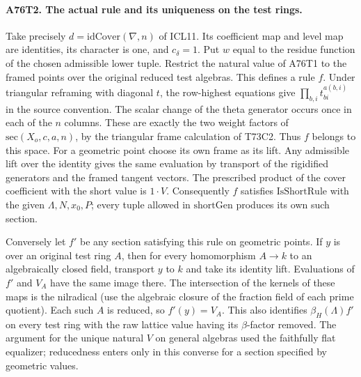 \paragraph{A76T2. The actual rule and its uniqueness on the test rings.}
Take precisely $d=\mathrm{idCover}(\nabla,n)$ of ICL11.
Its coefficient map and level map are identities, its character
is one, and $c_\delta=1$. Put $w$ equal to the residue function
of the chosen admissible lower tuple. Restrict the natural value of
A76T1 to the framed points over the original reduced test algebras.
This defines a rule $f$. Under triangular reframing with diagonal
$t$, the row-highest equations give $\prod_{b,i}t_{b i}^{a(b,i)}$
in the source convention. The scalar change of the theta generator
occurs once in each of the $n$ columns. These are exactly the two
weight factors of $\mathrm{sec}(X_o,c,a,n)$, by the triangular
frame calculation of T73C2. Thus $f$ belongs to this space.
For a geometric point choose its own frame as its lift. Any
admissible lift over the identity gives the same evaluation by
transport of the rigidified generators and the framed tangent
vectors. The prescribed product of the cover coefficient with the
short value is $1\cdot V$. Consequently $f$ satisfies
$\mathrm{IsShortRule}$ with the given $\Lambda,N,x_0,P$; every
tuple allowed in $\mathrm{shortGen}$ produces its own such
section.

Conversely let $f'$ be any section satisfying this rule on
geometric points. If $y$ is over an original test ring $A$,
then for every homomorphism $A\to k$ to an algebraically closed
field, transport $y$ to $k$ and take its identity lift. Evaluations
of $f'$ and $V_A$ have the same image there. The intersection of
the kernels of these maps is the nilradical (use the algebraic
closure of the fraction field of each prime quotient). Each such
$A$ is reduced, so $f'(y)=V_A$. This also identifies
$\beta_H(\Lambda) f'$ on every test ring with the raw lattice
value having its $\beta$-factor removed. The argument for the
unique natural $V$ on general algebras used the faithfully flat
equalizer; reducedness enters only in this converse for a section
specified by geometric values.
